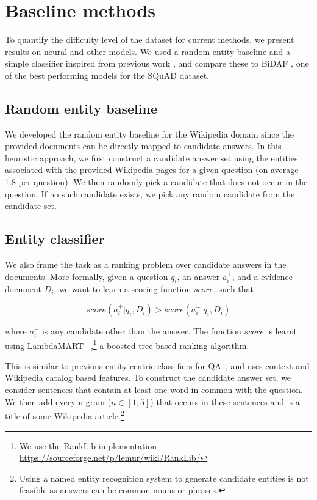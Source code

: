 \section{Baseline methods}\label{sec:methods}
To quantify the difficulty level of the dataset for current methods, we present results on neural and other models. We used a random entity baseline and a simple classifier inspired from previous work \cite{WangMCT2015, chen2016thorough}, and compare these to BiDAF \cite{SeoKFH16},  one of the best performing models for the SQuAD dataset.

\subsection{Random entity baseline} We developed the random entity baseline for the Wikipedia domain since the provided documents can be directly mapped to candidate answers. In this heuristic approach, we first construct a candidate answer set using the entities associated with the provided Wikipedia pages for a given question (on average 1.8 per question). We then randomly pick a candidate that does not occur in the question. If no such candidate exists, we pick any random candidate from the candidate set.

\subsection{Entity classifier} We also frame the task as a ranking problem over candidate answers in the documents. More formally, given a question $q_i$, an answer $a_i^+$, and a evidence document $D_i$, we want to learn a scoring function $score$, such that

\begin{equation*}
score(a_i^+ | q_i, D_i) > score(a_i^- | q_i, D_i) 
\end{equation*}

 where $a_i^-$ is any candidate other than the answer. The function $score$ is learnt using LambdaMART ~\cite{WuMart},\footnote{We use the RankLib implementation \url{https://sourceforge.net/p/lemur/wiki/RankLib/}} a boosted tree based ranking algorithm. 

This is similar to previous entity-centric classifiers for QA~\cite{chen2016thorough,WangMCT2015}, and uses context and Wikipedia catalog based features. To construct the candidate answer set, we consider sentences that contain at least one word in common with the question. We then add every n-gram ($n \in [1, 5]$) that occurs in these sentences and is a title of some Wikipedia article.\footnote{Using a named entity recognition system to generate candidate entities is not feasible as answers can be common nouns or phrases.} 

